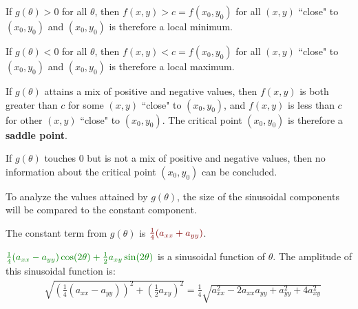 \documentclass{article}
\newcommand{\dr}[1]{\textcolor{dark_red}{#1}}
\newcommand{\dg}[1]{\textcolor{dark_green}{#1}}
\begin{document}
\begin{framed}
If \(g(\theta) > 0\) for all \(\theta\), then \(f(x, y) > c = f(x_0, y_0)\) for all \((x, y)\) ``close" to \((x_0, y_0)\) and \((x_0, y_0)\) is therefore a local minimum. 

\vspace{2mm}

If \(g(\theta) < 0\) for all \(\theta\), then \(f(x, y) < c = f(x_0, y_0)\) for all \((x, y)\) ``close" to \((x_0, y_0)\) and \((x_0, y_0)\) is therefore a local maximum. 

\vspace{2mm}

If \(g(\theta)\) attains a mix of positive and negative values, then \(f(x, y)\) is both greater than \(c\) for some \((x, y)\) ``close" to \((x_0, y_0)\), and \(f(x,y)\) is less than \(c\) for other \((x, y)\) ``close" to \((x_0, y_0)\). The critical point \((x_0, y_0)\) is therefore a {\bf saddle point}. 

\vspace{2mm}

If \(g(\theta)\) touches \(0\) but is not a mix of positive and negative values, then no information about the critical point \((x_0, y_0)\) can be concluded. 

\vspace{2mm}

To analyze the values attained by \(g(\theta)\), the size of the sinusoidal components will be compared to the constant component.

\vspace{2mm}

The constant term from \(g(\theta)\) is \(\dr{\frac{1}{4}(a_{xx} + a_{yy})}\). 

\vspace{2mm}

\(\dg{\frac{1}{4}(a_{xx} - a_{yy})\cos(2\theta) + \frac{1}{2}a_{xy}\sin(2\theta)}\) is a sinusoidal function of \(\theta\). The amplitude of this sinusoidal function is:
\begin{align*}
& \sqrt{\left(\frac{1}{4}(a_{xx} - a_{yy})\right)^2 + \left(\frac{1}{2}a_{xy}\right)^2} 
= \frac{1}{4}\sqrt{a_{xx}^2 - 2a_{xx}a_{yy} + a_{yy}^2 + 4a_{xy}^2}
\end{align*}


\end{framed}
\end{document}
